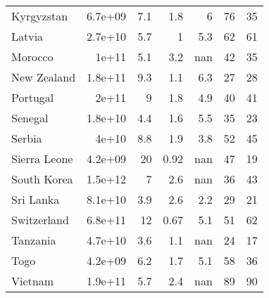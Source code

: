 \begin{table}
\begin{tabular}{lrrrrrr}
        Kyrgyzstan    & 6.7e+09 & 7.1    & 1.8      & 6         & 76      & 35      \\
        Latvia        & 2.7e+10 & 5.7    & 1        & 5.3       & 62      & 61      \\
        Morocco       & 1e+11   & 5.1    & 3.2      & nan       & 42      & 35      \\
        New Zealand   & 1.8e+11 & 9.3    & 1.1      & 6.3       & 27      & 28      \\
        Portugal      & 2e+11   & 9      & 1.8      & 4.9       & 40      & 41      \\
        Senegal       & 1.8e+10 & 4.4    & 1.6      & 5.5       & 35      & 23      \\
        Serbia        & 4e+10   & 8.8    & 1.9      & 3.8       & 52      & 45      \\
        Sierra Leone  & 4.2e+09 & 20     & 0.92     & nan       & 47      & 19      \\
        South Korea   & 1.5e+12 & 7      & 2.6      & nan       & 36      & 43      \\
        Sri Lanka     & 8.1e+10 & 3.9    & 2.6      & 2.2       & 29      & 21      \\
        Switzerland   & 6.8e+11 & 12     & 0.67     & 5.1       & 51      & 62      \\
        Tanzania      & 4.7e+10 & 3.6    & 1.1      & nan       & 24      & 17      \\
        Togo          & 4.2e+09 & 6.2    & 1.7      & 5.1       & 58      & 36      \\
        Vietnam       & 1.9e+11 & 5.7    & 2.4      & nan       & 89      & 90      \\
        \bottomrule
    \end{tabular}
\end{table}
